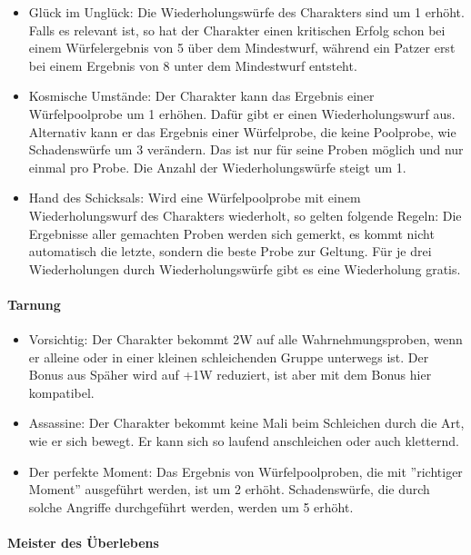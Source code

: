 \documentclass{article}
\begin{document}
\begin{itemize}
\item Glück im Unglück: Die Wiederholungswürfe des Charakters sind um 1 erhöht. Falls es relevant ist, so hat der Charakter einen kritischen Erfolg schon bei einem Würfelergebnis von 5 über dem Mindestwurf, während ein Patzer erst bei einem Ergebnis von 8 unter dem Mindestwurf entsteht.
\item Kosmische Umstände: Der Charakter kann das Ergebnis einer Würfelpoolprobe um 1 erhöhen. Dafür gibt er einen Wiederholungswurf aus. Alternativ kann er das Ergebnis einer Würfelprobe, die keine Poolprobe, wie Schadenswürfe um 3 verändern. Das ist nur für seine Proben möglich und nur einmal pro Probe. Die Anzahl der Wiederholungswürfe steigt um 1.
\item Hand des Schicksals: Wird eine Würfelpoolprobe mit einem Wiederholungswurf des Charakters wiederholt, so gelten folgende Regeln: Die Ergebnisse aller gemachten Proben werden sich gemerkt, es kommt nicht automatisch die letzte, sondern die beste Probe zur Geltung. Für je drei Wiederholungen durch Wiederholungswürfe gibt es eine Wiederholung gratis.
\end{itemize}

\paragraph{Tarnung}

\begin{itemize}
\item Vorsichtig: Der Charakter bekommt 2W auf alle Wahrnehmungsproben, wenn er alleine oder in einer kleinen schleichenden Gruppe unterwegs ist. Der Bonus aus Späher wird auf +1W reduziert, ist aber mit dem Bonus hier kompatibel.
\item Assassine: Der Charakter bekommt keine Mali beim Schleichen durch die Art, wie er sich bewegt. Er kann sich so laufend anschleichen oder auch kletternd.
\item Der perfekte Moment: Das Ergebnis von Würfelpoolproben, die mit ''richtiger Moment'' ausgeführt werden, ist um 2 erhöht. Schadenswürfe, die durch solche Angriffe durchgeführt werden, werden um 5 erhöht.
\end{itemize}

\paragraph{Meister des Überlebens}
\end{document}
